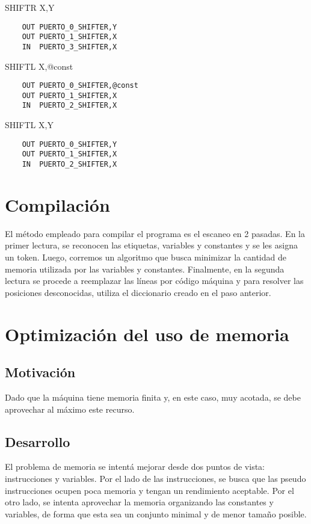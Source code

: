 \documentclass[12pt]{article}
\begin{document}
SHIFTR X,Y
\begin{verbatim}
    OUT PUERTO_0_SHIFTER,Y
    OUT PUERTO_1_SHIFTER,X
    IN  PUERTO_3_SHIFTER,X
\end{verbatim}

SHIFTL X,@const
\begin{verbatim}
    OUT PUERTO_0_SHIFTER,@const
    OUT PUERTO_1_SHIFTER,X
    IN  PUERTO_2_SHIFTER,X
\end{verbatim}

SHIFTL X,Y
\begin{verbatim}
    OUT PUERTO_0_SHIFTER,Y
    OUT PUERTO_1_SHIFTER,X
    IN  PUERTO_2_SHIFTER,X
\end{verbatim}

\section{Compilaci\'on}
El m\'etodo empleado para compilar el programa es el escaneo en 2 pasadas. En la
primer lectura, se reconocen las etiquetas, variables y constantes y se les asigna
un token. Luego, corremos un algoritmo que busca minimizar la cantidad de memoria
utilizada por las variables y constantes. Finalmente, en la segunda lectura se
procede a reemplazar las l\'ineas por c\'odigo m\'aquina y para resolver las
posiciones desconocidas, utiliza el diccionario creado en el paso anterior.

\section{Optimizaci\'on del uso de memoria}
\subsection{Motivaci\'on}
Dado que la m\'aquina tiene memoria finita y, en este caso, muy acotada,
 se debe aprovechar al m\'aximo este recurso.

\subsection{Desarrollo}
El problema de memoria se intent\'a mejorar desde dos puntos de vista: instrucciones
y variables. Por el lado de las instrucciones, se busca que las pseudo instrucciones
ocupen poca memoria y tengan un rendimiento aceptable. Por el otro lado, se intenta
aprovechar la memoria organizando las constantes y variables, de forma que esta sea
un conjunto minimal y de menor tama\~no posible.
\end{document}
